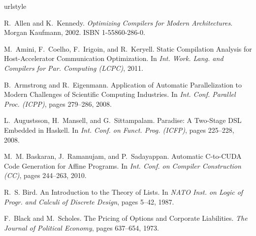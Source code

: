 \documentclass{sigplanconf}  %
\begin{document}


\softraggedright
%

\begin{thebibliography}{49}
\providecommand{\natexlab}[1]{#1}
\providecommand{\url}[1]{\texttt{#1}}
\expandafter\ifx\csname urlstyle\endcsname\relax
  \providecommand{\doi}[1]{doi: #1}\else
  \providecommand{\doi}{doi: \begingroup \urlstyle{rm}\Url}\fi

R.~Allen and K.~Kennedy.
\newblock \emph{{O}ptimizing {C}ompilers for {M}odern {A}rchitectures}.
\newblock Morgan Kaufmann, 2002.
\newblock ISBN 1-55860-286-0.

M.~Amini, F.~Coelho, F.~Irigoin, and R.~Keryell.
\newblock Static {C}ompilation {A}nalysis for {H}ost-{A}ccelerator
  {C}ommunication {O}ptimization.
\newblock In \emph{Int. Work. Lang. and Compilers for Par. Computing (LCPC)},
  2011.

B.~Armstrong and R.~Eigenmann.
\newblock Application of {A}utomatic {P}arallelization to {M}odern {C}hallenges
  of {S}cientific {C}omputing {I}ndustries.
\newblock In \emph{Int. Conf. Parallel Proc. (ICPP)}, pages 279--286, 2008.

L.~Augustsson, H.~Mansell, and G.~Sittampalam.
\newblock Paradise: {A} {T}wo-{S}tage {DSL} {E}mbedded in {Haskell}.
\newblock In \emph{Int. Conf. on Funct. Prog. (ICFP)}, pages 225--228, 2008.

M.~M. Baskaran, J.~Ramanujam, and P.~Sadayappan.
\newblock Automatic {C}-to-{CUDA} {C}ode {G}eneration for {A}ffine {P}rograms.
\newblock In \emph{Int. Conf. on Compiler Construction (CC)}, pages 244--263,
  2010.

R.~S. Bird.
\newblock An {I}ntroduction to the {T}heory of {L}ists.
\newblock In \emph{NATO Inst. on Logic of Progr. and Calculi of Discrete
  Design}, pages 5--42, 1987.

F.~Black and M.~Scholes.
\newblock The {P}ricing of {O}ptions and {C}orporate {L}iabilities.
\newblock \emph{The Journal of Political Economy}, pages 637--654, 1973.


\end{thebibliography}
\end{document}
